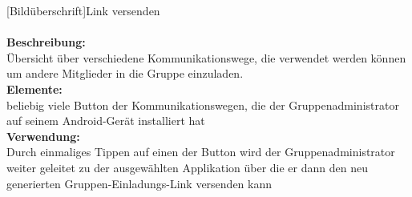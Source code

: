 [Bildüberschrift]Link versenden\\ \\
\textbf{Beschreibung:}\\
Übersicht über verschiedene Kommunikationswege, die verwendet werden können um andere Mitglieder in die Gruppe einzuladen.\\
\textbf{Elemente:}\\
beliebig viele Button der Kommunikationswegen, die der Gruppenadministrator auf seinem Android-Gerät installiert hat\\
\textbf{Verwendung:}\\
Durch einmaliges Tippen auf einen der Button wird der Gruppenadministrator weiter geleitet zu der ausgewählten Applikation über die er dann den neu generierten Gruppen-Einladungs-Link versenden kann\\ \\

